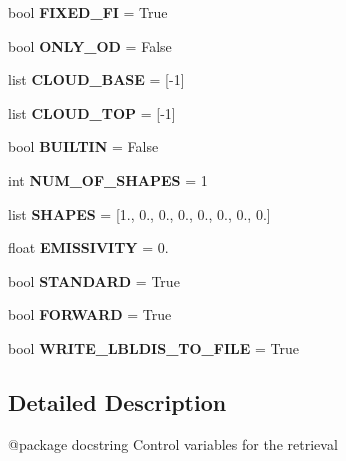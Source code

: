 \begin{DoxyCompactItemize}
bool {\bfseries F\+I\+X\+E\+D\+\_\+\+FI} = True
\item 
\mbox{\label{namespaceinp_a29268a056daa78192ec658c18e54f2d5}} 
bool {\bfseries O\+N\+L\+Y\+\_\+\+OD} = False
\item 
\mbox{\label{namespaceinp_af5b2679cf69bb2743e6c66a759d365fd}} 
list {\bfseries C\+L\+O\+U\+D\+\_\+\+B\+A\+SE} = \mbox{[}-\/1\mbox{]}
\item 
\mbox{\label{namespaceinp_affb12914742da23ba902310b3a7ab34d}} 
list {\bfseries C\+L\+O\+U\+D\+\_\+\+T\+OP} = \mbox{[}-\/1\mbox{]}
\item 
\mbox{\label{namespaceinp_abfceb94024fdf8598e36c2477350df38}} 
bool {\bfseries B\+U\+I\+L\+T\+IN} = False
\item 
\mbox{\label{namespaceinp_aaee417e610cc8fbd90e1faec9f83131d}} 
int {\bfseries N\+U\+M\+\_\+\+O\+F\+\_\+\+S\+H\+A\+P\+ES} = 1
\item 
\mbox{\label{namespaceinp_a7d6827ddb57ec0e9f0837ed56064e982}} 
list {\bfseries S\+H\+A\+P\+ES} = \mbox{[}1., 0., 0., 0., 0., 0., 0., 0.\mbox{]}
\item 
\mbox{\label{namespaceinp_aa0b78c2c732b9f75ba6b71c0c96c0625}} 
float {\bfseries E\+M\+I\+S\+S\+I\+V\+I\+TY} = 0.
\item 
\mbox{\label{namespaceinp_aba1567aed7297d1d5ba81f278f6e611a}} 
bool {\bfseries S\+T\+A\+N\+D\+A\+RD} = True
\item 
\mbox{\label{namespaceinp_a8ea30ec3ee429444a29c089794cbec50}} 
bool {\bfseries F\+O\+R\+W\+A\+RD} = True
\item 
\mbox{\label{namespaceinp_a1bc7e72ac94d8b81b59cd9f871038821}} 
bool {\bfseries W\+R\+I\+T\+E\+\_\+\+L\+B\+L\+D\+I\+S\+\_\+\+T\+O\+\_\+\+F\+I\+LE} = True
\end{DoxyCompactItemize}


\subsection{Detailed Description}
\begin{DoxyVerb}@package docstring
Control variables for the retrieval
\end{DoxyVerb}
 